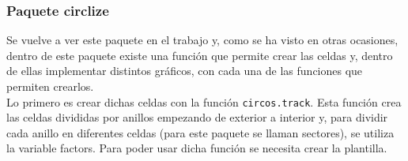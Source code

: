 \documentclass{article}\usepackage[]{graphicx}\usepackage[]{color}
\begin{document}
\subsubsection{Paquete circlize}
Se vuelve a ver este paquete %
en el trabajo y, como se ha visto en otras ocasiones, dentro de este paquete existe una funci\'on que permite crear las celdas y, dentro de ellas implementar distintos gr\'aficos, con cada una de las funciones que permiten crearlos.~\\
Lo primero es crear dichas celdas con la funci\'on \texttt{circos.track}. Esta funci\'on crea las celdas divididas por anillos empezando de exterior a interior y, para dividir cada anillo en diferentes celdas (para este paquete se llaman sectores), se utiliza la variable factors. Para poder usar dicha funci\'on se necesita crear la plantilla.~\\
\end{document}
